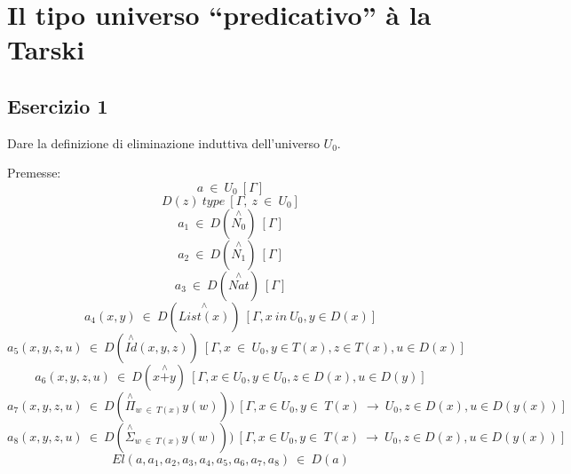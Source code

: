 \newpage
\section{Il tipo universo ``predicativo'' à la Tarski}
\subsection{Esercizio 1}
\begin{thm}
	Dare la definizione di eliminazione induttiva dell'universo $U_0$.
\end{thm}
Premesse:
\[a~\in~U_0~[\Gamma]\]
\[D(z)~type~[\Gamma,~z~\in~U_0]\]
\[a_1~\in~D(\stackrel{\wedge}{N_0})~[\Gamma]\]
\[a_2~\in~D(\stackrel{\wedge}{N_1})~[\Gamma]\]
\[a_3~\in~D(\stackrel{\wedge}{Nat})~[\Gamma]\]
\[a_4(x,y)~\in~D(\stackrel{\wedge}{List(x)})~[\Gamma,x~in~U_0,y\in D(x)]\]
\[a_5(x,y,z,u)~\in~D(\stackrel{\wedge}{Id}(x,y,z))~[\Gamma,x~\in~U_0,y\in T(x),z\in T(x), u\in D(x)]\]
\[a_6(x,y,z,u)~\in~D(x\stackrel{\wedge}{+}y)~[\Gamma,x\in U_0,y\in U_0,z\in D(x), u\in D(y)]\]
\[a_7(x,y,z,u)~\in~D(\stackrel{\wedge}{\Pi}_{w~\in~T(x)}y(w)))~[\Gamma,x\in U_0,y\in~T(x)~\to~U_0,z\in D(x), u\in D(y(x))]\]
\[a_8(x,y,z,u)~\in~D(\stackrel{\wedge}{\Sigma}_{w~\in~T(x)}y(w)))~[\Gamma,x\in U_0,y\in~T(x)~\to~U_0,z\in D(x), u\in D(y(x))]\]
\noindent\makebox[\linewidth]{\rule{\paperwidth}{0.4pt}}
\[El(a,a_1,a_2,a_3,a_4,a_5,a_6,a_7,a_8)~\in~D(a)\]


